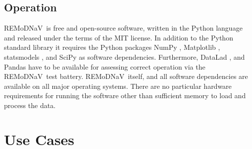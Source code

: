 \documentclass[10pt,a4paper]{extarticle}
\newcommand{\remodnav}{REMoDNaV}
\begin{document}

\subsection*{Operation}

\remodnav\ is free and open-source software, written in the Python language and
released under the terms of the MIT license. In addition to the Python standard
library it requires the Python packages
NumPy \cite{oliphant2006guide},
Matplotlib \cite{hunter2007matplotlib},
statsmodels \cite{seabold2010statsmodels},
and SciPy \cite{JOP+2001} as software dependencies.
Furthermore, DataLad \cite{HH+2013},
and Pandas \cite{mckinney2010data} have to be available for assessing
correct operation via the \remodnav\ test battery. \remodnav\ itself,
and all software dependencies are available on all major operating systems.
There are no particular hardware requirements for running the software
other than sufficient memory to load and process the data.



\section*{Use Cases} %
\end{document}

